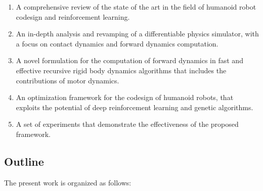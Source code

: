\begin{enumerate}
    \item A comprehensive review of the state of the art in the field of humanoid robot codesign and reinforcement learning.
    \item An in-depth analysis and revamping of a differentiable physics simulator, with a focus on contact dynamics and forward dynamics computation.
    \item A novel formulation for the computation of forward dynamics in fast and effective recursive rigid body dynamics algorithms that includes the contributions of motor dynamics.
    \item An optimization framework for the codesign of humanoid robots, that exploits the potential of deep reinforcement learning and genetic algorithms.
    \item A set of experiments that demonstrate the effectiveness of the proposed framework.
\end{enumerate}


\subsection*{Outline}

The present work is organized as follows:

